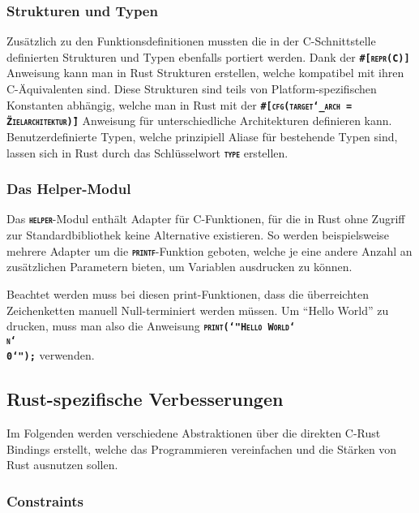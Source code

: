 \subsubsection{Strukturen und Typen}

Zusätzlich zu den Funktionsdefinitionen mussten die in der C-Schnittstelle definierten
Strukturen und Typen ebenfalls portiert werden.
Dank der \texttt{\textsc{\textbf{\#[repr(C)]}}} Anweisung kann man in Rust Strukturen erstellen,
welche kompatibel mit ihren C-Äquivalenten sind.
Diese Strukturen sind teils von Platform-spezifischen Konstanten abhängig, welche man in Rust mit der
\texttt{\textsc{\textbf{\#[cfg(target\char`_arch = \"Zielarchitektur\")]}}} Anweisung
für unterschiedliche Architekturen definieren kann.
Benutzerdefinierte Typen, welche prinzipiell Aliase für bestehende Typen sind, lassen sich in Rust durch das
Schlüsselwort \texttt{\textsc{\textbf{type}}} erstellen.

\subsubsection{Das Helper-Modul}

Das \texttt{\textsc{\textbf{helper}}}-Modul enthält Adapter für C-Funktionen,
für die in Rust ohne Zugriff zur Standardbibliothek keine Alternative existieren.
So werden beispielsweise mehrere Adapter um die \texttt{\textsc{\textbf{printf}}}-Funktion geboten,
welche je eine andere Anzahl an zusätzlichen Parametern bieten, um Variablen ausdrucken zu können.

Beachtet werden muss bei diesen print-Funktionen, dass die überreichten Zeichenketten manuell
Null-terminiert werden müssen. Um "`Hello World"' zu drucken, muss man also die Anweisung
\texttt{\textsc{\textbf{print(\char`"Hello World\char`\\n\char`\\0\char`");}}} verwenden.

\subsection{Rust-spezifische Verbesserungen}

Im Folgenden werden verschiedene Abstraktionen über die direkten C-Rust Bindings erstellt, welche das Programmieren
vereinfachen und die Stärken von Rust ausnutzen sollen.

\subsubsection{Constraints}

